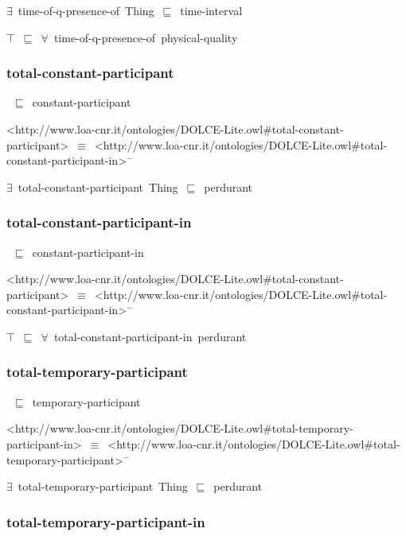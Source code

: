 \documentclass{article}
\begin{document}
\ensuremath{\exists}~time-of-q-presence-of~Thing~\ensuremath{\sqsubseteq}~time-interval

\ensuremath{\top}~\ensuremath{\sqsubseteq}~\ensuremath{\forall}~time-of-q-presence-of~physical-quality

\subsubsection*{total-constant-participant}

~\ensuremath{\sqsubseteq}~constant-participant

<http://www.loa-cnr.it/ontologies/DOLCE-Lite.owl#total-constant-participant>~\ensuremath{\equiv}~<http://www.loa-cnr.it/ontologies/DOLCE-Lite.owl#total-constant-participant-in>\ensuremath{^-}

\ensuremath{\exists}~total-constant-participant~Thing~\ensuremath{\sqsubseteq}~perdurant

\subsubsection*{total-constant-participant-in}

~\ensuremath{\sqsubseteq}~constant-participant-in

<http://www.loa-cnr.it/ontologies/DOLCE-Lite.owl#total-constant-participant>~\ensuremath{\equiv}~<http://www.loa-cnr.it/ontologies/DOLCE-Lite.owl#total-constant-participant-in>\ensuremath{^-}

\ensuremath{\top}~\ensuremath{\sqsubseteq}~\ensuremath{\forall}~total-constant-participant-in~perdurant

\subsubsection*{total-temporary-participant}

~\ensuremath{\sqsubseteq}~temporary-participant

<http://www.loa-cnr.it/ontologies/DOLCE-Lite.owl#total-temporary-participant-in>~\ensuremath{\equiv}~<http://www.loa-cnr.it/ontologies/DOLCE-Lite.owl#total-temporary-participant>\ensuremath{^-}

\ensuremath{\exists}~total-temporary-participant~Thing~\ensuremath{\sqsubseteq}~perdurant

\subsubsection*{total-temporary-participant-in}
\end{document}
